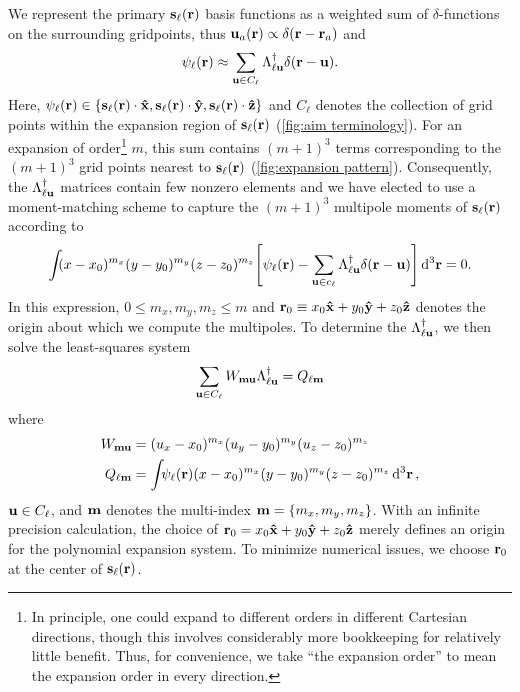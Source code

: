 We represent the primary $\vb{s}_\ell(\vb{r})$ basis functions as a weighted sum of $\delta$-functions on the surrounding gridpoints, thus $\vb{u}_a(\vb{r}) \propto \delta(\vb{r} - \vb{r}_a)$ and
\begin{equation}
  \psi_\ell(\vb{r}) \approx \sum_{\vb{u} \in C_\ell} \Lambda_{\ell\vb{u}}^\dagger \delta(\vb{r} - \vb{u}).
  \label{eq:grid linear combination}
\end{equation}
Here, $\psi_\ell(\vb{r}) \in \qty{\vb{s}_\ell(\vb{r})\cdot \vu{x}, \vb{s}_\ell(\vb{r}) \cdot \vu{y}, \vb{s}_\ell(\vb{r}) \cdot \vu{z}}$ and $C_\ell$ denotes the collection of grid points within the expansion region of $\vb{s}_\ell(\vb{r})$ (\cref{fig:aim terminology}).
For an expansion of order\footnote{In principle, one could expand to different orders in different Cartesian directions, though this involves considerably more bookkeeping for relatively little benefit. Thus, for convenience, we take ``the expansion order'' to mean the expansion order in every direction.} $m$, this sum contains $(m + 1)^3$ terms corresponding to the $(m + 1)^3$ grid points nearest to $\vb{s}_\ell(\vb{r})$ (\cref{fig:expansion pattern}).
Consequently, the $\Lambda_{\ell \vb{u}}^\dagger$ matrices contain few nonzero elements and we have elected to use a moment-matching scheme to capture the $(m + 1)^3$ multipole moments of $\vb{s}_\ell(\vb{r})$ according to
\begin{equation}
  \int_{} \kern0.1em (x - x_0)^{m_x}(y - y_0)^{m_y}(z - z_0)^{m_z} \qty[\psi_\ell(\vb{r}) - \sum_{\vb{u} \in c_\ell} \Lambda_{\ell\vb{u}}^\dagger \delta(\vb{r} - \vb{u})] \dd[3]{\vb{r}} = 0.
  \label{eq:moment matching}
\end{equation}
In this expression, $0 \leqslant m_x, m_y, m_z \leqslant m$ and $\vb{r}_0 \equiv x_0 \vu{x} + y_0 \vu{y} + z_0\vu{z}$ denotes the origin about which we compute the multipoles.
To determine the $\Lambda_{\ell \vb{u}}^\dagger$, we then solve the least-squares system
\begin{equation}
  \sum_{\vb{u} \in C_\ell} W_{\vb{m}\vb{u}}\Lambda_{\ell\vb{u}}^\dagger = Q_{\ell\vb{m}}
  \label{eq:expansion matrix system}
\end{equation}
where
\begin{subequations}
  \begin{align}
    W_{\vb{m}\vb{u}} &= (u_x - x_0)^{m_x} (u_y - y_0)^{m_y} (u_z - z_0)^{m_z} \label{eq:w matrix} \\
    Q_{\ell \vb{m}} &= \int_{} \psi_\ell(\vb{r}) (x - x_0)^{m_x} (y - y_0)^{m_y} (z - z_0)^{m_z} \dd[3]{\vb{r}} \label{eq:q vector},
  \end{align}
\end{subequations}
$\vb{u} \in C_\ell$, and $\vb{m}$ denotes the multi-index $\vb{m} = \qty{m_x, m_y, m_z}$.
With an infinite precision calculation, the choice of $\vb{r}_0 = x_0 \vu{x} + y_0 \vu{y} + z_0 \vu{z}$ merely defines an origin for the polynomial expansion system.
To minimize numerical issues, we choose $\vb{r}_0$ at the center of $\vb{s}_\ell(\vb{r})$.

